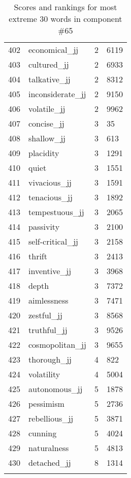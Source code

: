 \begin{longtable}[!htbp]{| rlr@{.}l |}
    402 & economical\_jj & 2 & 6119 \\
    403 & cultured\_jj & 2 & 6933 \\
    404 & talkative\_jj & 2 & 8312 \\
    405 & inconsiderate\_jj & 2 & 9150 \\
    406 & volatile\_jj & 2 & 9962 \\
    407 & concise\_jj & 3 & 35 \\
    408 & shallow\_jj & 3 & 613 \\
    409 & placidity & 3 & 1291 \\
    410 & quiet & 3 & 1551 \\
    411 & vivacious\_jj & 3 & 1591 \\
    412 & tenacious\_jj & 3 & 1892 \\
    413 & tempestuous\_jj & 3 & 2065 \\
    414 & passivity & 3 & 2100 \\
    415 & self-critical\_jj & 3 & 2158 \\
    416 & thrift & 3 & 2413 \\
    417 & inventive\_jj & 3 & 3968 \\
    418 & depth & 3 & 7372 \\
    419 & aimlessness & 3 & 7471 \\
    420 & zestful\_jj & 3 & 8568 \\
    421 & truthful\_jj & 3 & 9526 \\
    422 & cosmopolitan\_jj & 3 & 9655 \\
    423 & thorough\_jj & 4 & 822 \\
    424 & volatility & 4 & 5004 \\
    425 & autonomous\_jj & 5 & 1878 \\
    426 & pessimism & 5 & 2736 \\
    427 & rebellious\_jj & 5 & 3871 \\
    428 & cunning & 5 & 4024 \\
    429 & naturalness & 5 & 4813 \\
    430 & detached\_jj & 8 & 1314 \\
    \hline
    \caption{Scores and rankings for most extreme 30 words in component \#65} \\
\end{longtable}
